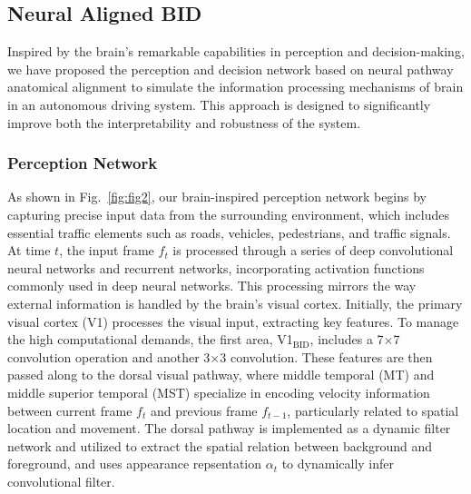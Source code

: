 \subsection{Neural Aligned BID}
\hspace{1pc}Inspired by the brain's remarkable capabilities in perception and decision-making, we have proposed the perception and decision network based on neural pathway anatomical alignment to simulate the information processing mechanisms of brain in an autonomous driving system. 
This approach is designed to significantly improve both the interpretability and robustness of the system.

\subsubsection{Perception Network}
\hspace{1pc}As shown in Fig.~\ref{fig:fig2}, our brain-inspired perception network begins by capturing precise input data from the surrounding environment, which includes essential traffic elements such as roads, vehicles, pedestrians, and traffic signals. 
At time $t$, the input frame $f_t$ is processed through a series of deep convolutional neural networks and recurrent networks, incorporating activation functions commonly used in deep neural networks. 
This processing mirrors the way external information is handled by the brain's visual cortex\cite{kubilius2019brain}. 
Initially, the primary visual cortex (V1) processes the visual input, extracting key features. 
To manage the high computational demands, the first area, V1$_\text{BID}$, includes a 7$\times$7 convolution operation and another 3$\times$3 convolution. 
These features are then passed along to the dorsal visual pathway, where middle temporal (MT) and middle superior temporal (MST) specialize in encoding velocity information between current frame $ f_t $ and previous frame $ f_{t-1} $, particularly related to spatial location and movement\cite{wang2022btn}. 
The dorsal pathway is implemented as a dynamic filter network\cite{jia2016dynamic} and utilized to extract the spatial relation between background and foreground, 
and uses appearance repsentation $ \alpha_t $ to dynamically infer convolutional filter.


